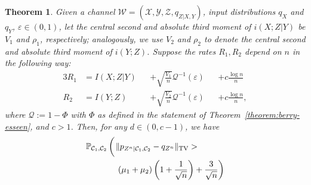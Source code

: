 \documentclass[journal]{IEEEtran}
\newcommand{\channelpmf}{q}
\newcommand{\codebookpmf}{p}
\newcommand{\codebookRateOne}{R_1}
\newcommand{\codebookRateTwo}{R_2}
\newcommand{\channelInOne}{X}
\newcommand{\channelInOneAlph}{\mathcal{X}}
\newcommand{\channelInTwo}{Y}
\newcommand{\channelInTwoAlph}{\mathcal{Y}}
\newcommand{\channelOut}{Z}
\newcommand{\channelOutAlph}{\mathcal{Z}}
\newcommand{\channel}{\mathcal{W}}
\newcommand{\codebookOne}{\mathcal{C}_1}
\newcommand{\codebookTwo}{\mathcal{C}_2}
\newcommand{\codebookBlocklength}{n}
\newcommand{\mutualInformation}[2]{I(#1;#2)}
\newcommand{\mutualInformationConditional}[3]{I(#1;#2|#3)}
\newcommand{\totalvariation}[1]{\lVert #1 \rVert_\mathrm{TV}}
\newcommand{\informationDensity}[2]{i({#1};{#2})}
\newcommand{\informationDensityConditional}[3]{i({#1};{#2} | {#3})}
\newcommand{\Probability}{\mathbb{P}}
\newcommand{\typicalityParam}{\varepsilon}
\newcommand{\channelDispersion}[1]{V_{#1}}
\newcommand{\channelThirdMoment}[1]{\rho_{#1}}
\newcommand{\normalcdfComplement}{\mathcal{Q}}
\newcommand{\normalcdf}{\Phi}
\newcommand{\normalcdfComplementInverse}{\mathcal{Q}^{-1}}
\newcommand{\secondOrderParamC}{c}
\newcommand{\secondOrderParamD}{d}
\newcommand{\secondOrderAtypicalProbability}[1]{\mu_{#1}}
\newtheorem{theorem}{Theorem}
\begin{document}
\begin{theorem}
\label{theorem:soft-covering-two-transmitters-second-order}
Given a channel
$\channel = (\channelInOneAlph, \channelInTwoAlph, \channelOutAlph, \channelpmf_{\channelOut | \channelInOne, \channelInTwo})$,
input distributions $\channelpmf_\channelInOne$ and $\channelpmf_\channelInTwo$, $\typicalityParam \in (0,1)$, let the central second and absolute third moment of $\informationDensityConditional{\channelInOne}{\channelOut}{\channelInTwo}$ be $\channelDispersion{1}$ and $\channelThirdMoment{1}$, respectively; analogously, we use $\channelDispersion{2}$ and $\channelThirdMoment{2}$ to denote the central second and absolute third moment of $\informationDensity{\channelInTwo}{\channelOut}$. Suppose the rates $\codebookRateOne, \codebookRateTwo$ depend on $\codebookBlocklength$ in the following way:
\begin{alignat}{3}
\label{theorem:soft-covering-two-transmitters-second-order-rate-one}
\codebookRateOne
&=
\mutualInformationConditional{\channelInOne}{\channelOut}{\channelInTwo}&
&+
\sqrt{\frac{\channelDispersion{1}}{\codebookBlocklength}} \normalcdfComplementInverse(\typicalityParam)&
&+
\secondOrderParamC\frac{\log \codebookBlocklength}
                       {\codebookBlocklength} \\
\label{theorem:soft-covering-two-transmitters-second-order-rate-two}
\codebookRateTwo
&=
\mutualInformation{\channelInTwo}{\channelOut}&
&+
\sqrt{\frac{\channelDispersion{2}}{\codebookBlocklength}} \normalcdfComplementInverse(\typicalityParam)&
&+
\secondOrderParamC\frac{\log \codebookBlocklength}
                       {\codebookBlocklength},
\end{alignat}
where $\normalcdfComplement := 1 - \normalcdf$ with $\normalcdf$ as defined in the statement of Theorem~\ref{theorem:berry-esseen}, and $\secondOrderParamC>1$. Then, for any $\secondOrderParamD \in (0, \secondOrderParamC-1)$, we have
\begin{multline*}
\begin{aligned}
  \Probability_{\codebookOne, \codebookTwo}
  \left( \vphantom{\frac{1}{\sqrt{\codebookBlocklength}}}
  \right.
    &\totalvariation{\codebookpmf_{\channelOut^\codebookBlocklength | \codebookOne, \codebookTwo} - \channelpmf_{\channelOut^\codebookBlocklength}}
    >
    \\ &\left.
    (\secondOrderAtypicalProbability{1} + \secondOrderAtypicalProbability{2})
    \left(1+\frac{1}{\sqrt{\codebookBlocklength}}\right)
    +
    \frac{3}{\sqrt{\codebookBlocklength}}
  \right)
\end{aligned}

\end{multline*}
\end{theorem}
\end{document}

